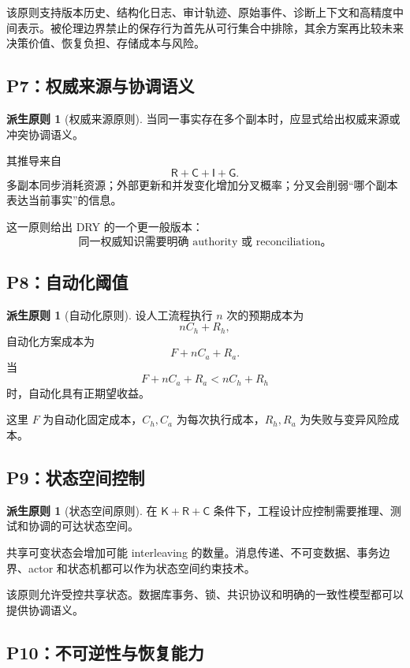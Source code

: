 \documentclass[11pt,a4paper]{ctexart}
\numberwithin{equation}{section}
\theoremstyle{definition}
\newtheorem{principle}[definition]{派生原则}
\theoremstyle{plain}
\newcommand{\Know}{\mathsf{K}}
\newcommand{\Res}{\mathsf{R}}
\newcommand{\Ctrl}{\mathsf{C}}
\newcommand{\Info}{\mathsf{I}}
\newcommand{\Goal}{\mathsf{G}}
\begin{document}
该原则支持版本历史、结构化日志、审计轨迹、原始事件、诊断上下文和高精度中间表示。被伦理边界禁止的保存行为首先从可行集合中排除，其余方案再比较未来决策价值、恢复负担、存储成本与风险。

\subsection{P7：权威来源与协调语义}

\begin{principle}[权威来源原则]
当同一事实存在多个副本时，应显式给出权威来源或冲突协调语义。
\end{principle}

其推导来自
\[
\Res+\Ctrl+\Info+\Goal.
\]
多副本同步消耗资源；外部更新和并发变化增加分叉概率；分叉会削弱“哪个副本表达当前事实”的信息。

这一原则给出 DRY 的一个更一般版本：
\[
\boxed{\text{同一权威知识需要明确 authority 或 reconciliation。}}
\]

\subsection{P8：自动化阈值}

\begin{principle}[自动化原则]
设人工流程执行 $n$ 次的预期成本为
\[
nC_h+R_h,
\]
自动化方案成本为
\[
F+nC_a+R_a.
\]
当
\[
F+nC_a+R_a<nC_h+R_h
\]
时，自动化具有正期望收益。
\end{principle}

这里 $F$ 为自动化固定成本，$C_h,C_a$ 为每次执行成本，$R_h,R_a$ 为失败与变异风险成本。

\subsection{P9：状态空间控制}

\begin{principle}[状态空间原则]
在 $\Know+\Res+\Ctrl$ 条件下，工程设计应控制需要推理、测试和协调的可达状态空间。
\end{principle}

共享可变状态会增加可能 interleaving 的数量。消息传递、不可变数据、事务边界、actor 和状态机都可以作为状态空间约束技术。

该原则允许受控共享状态。数据库事务、锁、共识协议和明确的一致性模型都可以提供协调语义。

\subsection{P10：不可逆性与恢复能力}
\end{document}
